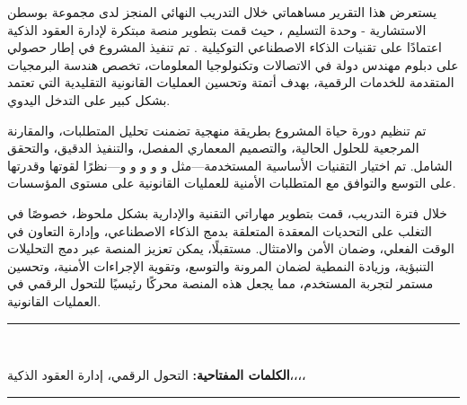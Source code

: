 \begin{RLtext}

يستعرض هذا التقرير مساهماتي خلال التدريب النهائي المنجز لدى مجموعة بوسطن الاستشارية - وحدة التسليم ، حيث قمت بتطوير منصة مبتكرة لإدارة العقود الذكية اعتمادًا على تقنيات الذكاء الاصطناعي التوكيلية . تم تنفيذ المشروع في إطار حصولي على دبلوم مهندس دولة في الاتصالات وتكنولوجيا المعلومات، تخصص هندسة البرمجيات المتقدمة للخدمات الرقمية، بهدف أتمتة وتحسين العمليات القانونية التقليدية التي تعتمد بشكل كبير على التدخل اليدوي.

تم تنظيم دورة حياة المشروع بطريقة منهجية تضمنت تحليل المتطلبات، والمقارنة المرجعية للحلول الحالية، والتصميم المعماري المفصل، والتنفيذ الدقيق، والتحقق الشامل. تم اختيار التقنيات الأساسية المستخدمة—مثل  و و و و و—نظرًا لقوتها وقدرتها على التوسع والتوافق مع المتطلبات الأمنية للعمليات القانونية على مستوى المؤسسات.

خلال فترة التدريب، قمت بتطوير مهاراتي التقنية والإدارية بشكل ملحوظ، خصوصًا في التغلب على التحديات المعقدة المتعلقة بدمج الذكاء الاصطناعي، وإدارة التعاون في الوقت الفعلي، وضمان الأمن والامتثال. مستقبلًا، يمكن تعزيز المنصة عبر دمج التحليلات التنبؤية، وزيادة النمطية لضمان المرونة والتوسع، وتقوية الإجراءات الأمنية، وتحسين مستمر لتجربة المستخدم، مما يجعل هذه المنصة محركًا رئيسيًا للتحول الرقمي في العمليات القانونية.

\bigskip
\end{RLtext}

\noindent\rule{\linewidth}{0.3mm} \\[0.05cm] 
\begin{RLtext}
    \textbf{الكلمات المفتاحية:} التحول الرقمي، إدارة العقود الذكية،،،،
\end{RLtext}

\noindent\rule{\linewidth}{0.3mm} \\[0.6cm]